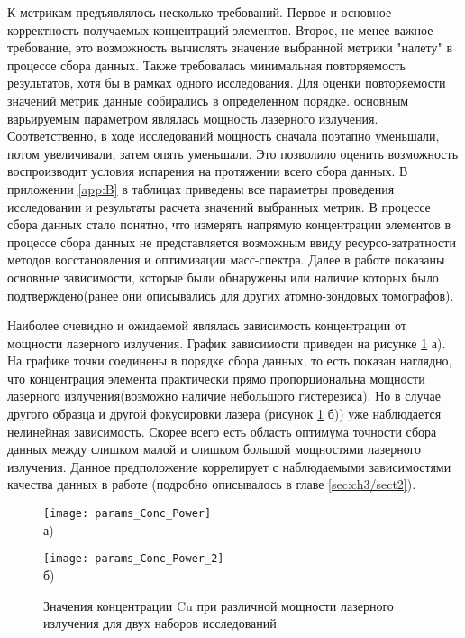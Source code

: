 К метрикам предъявлялось несколько требований. Первое и основное - корректность получаемых концентраций элементов. Второе, не менее важное требование, это возможность вычислять значение выбранной метрики "налету" в процессе сбора данных. Также требовалась минимальная повторяемость результатов, хотя бы в рамках одного исследования. Для оценки повторяемости значений метрик данные собирались в определенном порядке. основным варьируемым параметром являлась мощность лазерного излучения. Соответственно, в ходе исследований мощность сначала поэтапно уменьшали, потом увеличивали, затем опять уменьшали. Это позволило оценить возможность воспроизводит условия испарения на протяжении всего сбора данных.  В приложении \cref{app:B} в таблицах приведены все параметры проведения исследовании и результаты расчета значений выбранных метрик. В процессе сбора данных стало понятно, что измерять напрямую концентрации элементов в процессе сбора данных не представляется возможным ввиду ресурсо-затратности методов восстановления и оптимизации масс-спектра.
Далее в работе показаны основные зависимости, которые были обнаружены или наличие которых было подтверждено(ранее они описывались для других атомно-зондовых томографов).

Наиболее очевидно и ожидаемой являлась зависимость концентрации от мощности лазерного излучения. График зависимости приведен на рисунке \cref{fig:params_Conc_Power} а). На графике точки соединены в порядке сбора данных, то есть показан наглядно, что концентрация элемента практически прямо пропорциональна мощности лазерного излучения(возможно наличие небольшого гистерезиса). Но в случае другого образца и другой фокусировки лазера (рисунок \cref{fig:params_Conc_Power} б)) уже наблюдается нелинейная зависимость. Скорее всего есть область оптимума точности сбора данных между слишком малой и слишком большой мощностями лазерного излучения. Данное предположение коррелирует с наблюдаемыми зависимостями качества данных в работе \cite{scbibOptParamsYAFI} (подробно описывалось в главе \cref{sec:ch3/sect2}).

\begin{figure}[htb]
	\begin{minipage}[b]{0.49\textwidth}\centering
		\texttt{[image: params\_Conc\_Power]} \\ а)
	\end{minipage}
	\begin{minipage}[b]{0.49\textwidth}\centering
		\texttt{[image: params\_Conc\_Power\_2]} \\ б)
	\end{minipage}
	\caption{Значения концентрации Cu при различной мощности лазерного излучения для двух наборов исследований}
	\label{fig:params_Conc_Power}
\end{figure}
\FloatBarrier

